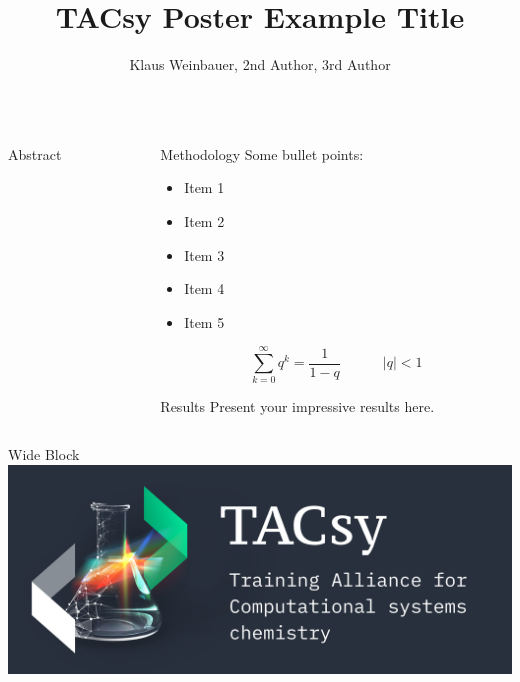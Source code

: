 \documentclass{beamer}
\title[Beamer Poster]{TACsy Poster Example Title}
\author{Klaus Weinbauer, 2nd Author, 3rd Author}
\institute{Bioinformatik, Institut für Informatik}
\begin{document}
\begin{frame}
	\vfill
	\begin{columns}[t]
		\begin{column}{.48\linewidth}
			\begin{block}{Abstract}
				\lipsum[1]
			\end{block}
		\end{column}
		\begin{column}{.48\linewidth}
			\begin{block}{Methodology}
				Some bullet points:
				\begin{itemize}
					\item Item 1
					\item Item 2
					\item Item 3
					\item Item 4
					\item Item 5
				\end{itemize}
				\begin{equation}
					\sum_{k=0}^{\infty}{q^k} = \frac{1}{1-q} \quad\quad\quad |q| < 1 
				\end{equation}
			\end{block}
			\begin{block}{Results}
				Present your impressive results here.
			\end{block}
		\end{column}
	\end{columns}
	\vfill
	\begin{columns}[t]
		\begin{column}{.98\linewidth}
			\begin{block}{Wide Block}
				\centering
				\includegraphics[width=\linewidth]{template_figures/tacsy_logo.jpg}
			\end{block}
		\end{column}
	\end{columns}
	\vfill
\end{frame}
\end{document}
